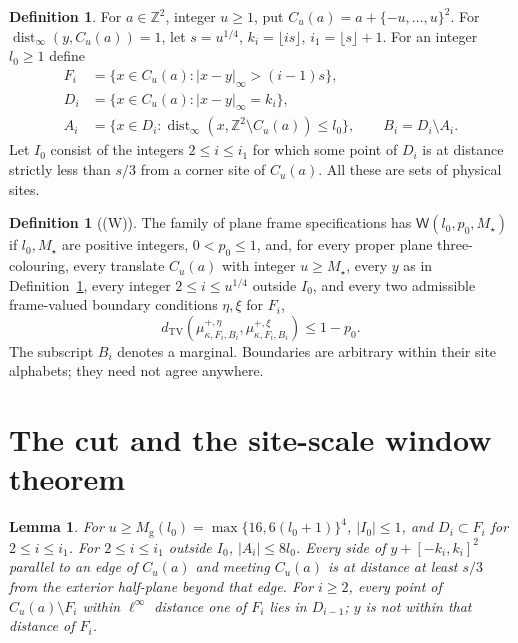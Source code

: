 \documentclass[11pt,reqno]{amsart}
\newtheorem{lemma}[theorem]{Lemma}
\theoremstyle{definition}
\newtheorem{definition}[theorem]{Definition}
\theoremstyle{remark}
\begin{document}
\begin{definition}\label{d:shells}
For \(a\in\mathbb Z^2\), integer \(u\ge1\), put
\(C_u(a)=a+\{-u,\ldots,u\}^2\).
For \(\operatorname{dist}_\infty(y,C_u(a))=1\), let
\(s=u^{1/4}\), \(k_i=\lfloor is\rfloor\), \(i_1=\lfloor s\rfloor+1\).
For an integer \(l_0\ge1\) define
\[
 \begin{split}
 F_i&=\{x\in C_u(a):|x-y|_\infty>(i-1)s\},\\
 D_i&=\{x\in C_u(a):|x-y|_\infty=k_i\},\\
 A_i&=\{x\in D_i:\operatorname{dist}_\infty
                    (x,\mathbb Z^2\setminus C_u(a))\le l_0\},\qquad
 B_i=D_i\setminus A_i .
 \end{split}
\]
Let \(I_0\) consist of the integers \(2\le i\le i_1\) for which
some point of \(D_i\) is at distance strictly less than \(s/3\)
from a corner site of \(C_u(a)\).
All these are sets of physical sites.
\end{definition}

\begin{definition}[(W)]\label{d:W}
The family of plane frame specifications has \(\mathsf W(l_0,p_0,M_\star)\)
if \(l_0,M_\star\) are positive integers, \(0<p_0\le1\), and,
for every proper plane three-colouring, every translate \(C_u(a)\)
with integer \(u\ge M_\star\), every \(y\) as in Definition~\ref{d:shells},
every integer \(2\le i\le u^{1/4}\) outside \(I_0\), and every two
admissible frame-valued boundary conditions \(\eta,\xi\) for \(F_i\),
\[
 d_{\mathrm{TV}}\!\left(
       \mu^{+,\eta}_{\kappa,F_i,B_i},
       \mu^{+,\xi}_{\kappa,F_i,B_i}\right)\le1-p_0 .
\]
The subscript \(B_i\) denotes a marginal. Boundaries are arbitrary
within their site alphabets; they need not agree anywhere.
\end{definition}


\section{The cut and the site-scale window theorem}

\begin{lemma}\label{l:shellgeom}
For \(u\ge M_{\mathrm g}(l_0)=\max\{16,6(l_0+1)\}^4\),
\(|I_0|\le1\), and \(D_i\subset F_i\) for \(2\le i\le i_1\).
For \(2\le i\le i_1\) outside \(I_0\), \(|A_i|\le8l_0\).
Every side of \(y+[-k_i,k_i]^2\) parallel to an edge of \(C_u(a)\)
and meeting \(C_u(a)\) is at distance at least \(s/3\) from the
exterior half-plane beyond that edge.
For \(i\ge2\), every point of \(C_u(a)\setminus F_i\)
within \(\ell^\infty\) distance one of \(F_i\) lies in \(D_{i-1}\);
\(y\) is not within that distance of \(F_i\).
\end{lemma}
\end{document}
